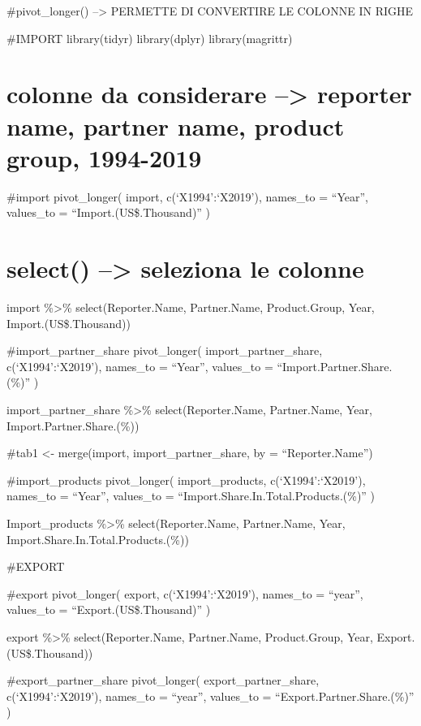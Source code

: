 \documentclass[
]{article}
\begin{document}
\#pivot\_longer() --\textgreater{} PERMETTE DI CONVERTIRE LE COLONNE IN
RIGHE

\#IMPORT library(tidyr) library(dplyr) library(magrittr)

\hypertarget{colonne-da-considerare-reporter-name-partner-name-product-group-1994-2019}{%
\section{colonne da considerare --\textgreater{} reporter name, partner
name, product group,
1994-2019}\label{colonne-da-considerare-reporter-name-partner-name-product-group-1994-2019}}

\#import pivot\_longer( import, c(`X1994':`X2019'), names\_to =
``Year'', values\_to = ``Import.(US\$.Thousand)'' )

\hypertarget{select-seleziona-le-colonne}{%
\section{select() --\textgreater{} seleziona le
colonne}\label{select-seleziona-le-colonne}}

import \%\textgreater\% select(Reporter.Name, Partner.Name,
Product.Group, Year, Import.(US\$.Thousand))

\#import\_partner\_share pivot\_longer( import\_partner\_share,
c(`X1994':`X2019'), names\_to = ``Year'', values\_to =
``Import.Partner.Share.(\%)'' )

import\_partner\_share \%\textgreater\% select(Reporter.Name,
Partner.Name, Year, Import.Partner.Share.(\%))

\#tab1 \textless- merge(import, import\_partner\_share, by =
``Reporter.Name'')

\#import\_products pivot\_longer( import\_products, c(`X1994':`X2019'),
names\_to = ``Year'', values\_to =
``Import.Share.In.Total.Products.(\%)'' )

Import\_products \%\textgreater\% select(Reporter.Name, Partner.Name,
Year, Import.Share.In.Total.Products.(\%))

\#EXPORT

\#export pivot\_longer( export, c(`X1994':`X2019'), names\_to =
``year'', values\_to = ``Export.(US\$.Thousand)'' )

export \%\textgreater\% select(Reporter.Name, Partner.Name,
Product.Group, Year, Export.(US\$.Thousand))

\#export\_partner\_share pivot\_longer( export\_partner\_share,
c(`X1994':`X2019'), names\_to = ``year'', values\_to =
``Export.Partner.Share.(\%)'' )
\end{document}
